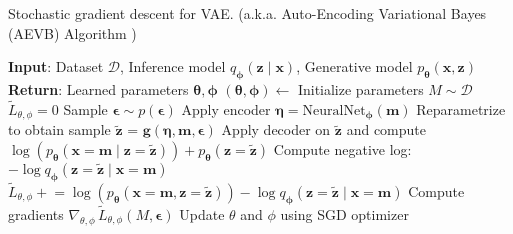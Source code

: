 \begin{algorithm}[H]
    \caption[SGD for VAE]{Stochastic gradient descent for VAE. (a.k.a. Auto-Encoding Variational Bayes (AEVB) Algorithm )}
    \label{alg:sgd}
    \begin{algorithmic}[1]
    \State \textbf{Input}: Dataset $\mathcal{D}$, Inference model $q_{\boldsymbol{\phi}}(\mathbf{z}\mid \mathbf{x})$, Generative model $p_{\boldsymbol{\theta}}(\mathbf{x},\mathbf{z})$
    \State \textbf{Return}: Learned parameters $\boldsymbol{\theta}, \boldsymbol{\phi}$
    \State $(\boldsymbol{\theta}, \boldsymbol{\phi}) \leftarrow$ Initialize parameters
    \State $M \sim \mathcal{D}$ 
    \State $\tilde{L}_{\theta,\phi} = 0$
        \State Sample $\boldsymbol{\epsilon} \sim p(\boldsymbol{\epsilon})$ 
        \State Apply encoder $\boldsymbol{\eta} = \mathrm{NeuralNet}_{\boldsymbol{\phi}}(\boldsymbol{m})$
        \State Reparametrize to obtain sample $\tilde{\boldsymbol{z}}$ = $\boldsymbol{g}(\boldsymbol{\eta},\boldsymbol{m},\boldsymbol{\epsilon})$ 
        \State Apply decoder on $\tilde{\boldsymbol{z}}$ and compute $\log(p_{\boldsymbol{\theta}}(\mathbf{x}=\boldsymbol{m}\mid \mathbf{z}=\tilde{\boldsymbol{z}})) + p_{\boldsymbol{\theta}}(\boldsymbol{z}=\tilde{\boldsymbol{z}})$
        \State Compute negative log: $-\log q_{\boldsymbol{\phi}}(\boldsymbol{z}=\tilde{\boldsymbol{z}}\mid \boldsymbol{x}=\boldsymbol{m})$ 
        \State $\tilde{L}_{\theta,\phi} \mathrel{+}= \log(p_{\boldsymbol{\theta}}(\mathbf{x}=\boldsymbol{m},\mathbf{z}=\tilde{\boldsymbol{z}})) - \log q_{\boldsymbol{\phi}}(\boldsymbol{z}=\tilde{\boldsymbol{z}}\mid \boldsymbol{x}=\boldsymbol{m})$ 
    \EndFor
    \State Compute gradients $\nabla_{\theta,\phi} \,\tilde{L}_{\theta,\phi}(M, \boldsymbol{\epsilon})$
    \State Update $\theta$ and $\phi$ using SGD optimizer
    \EndWhile
    \end{algorithmic}
\end{algorithm}

